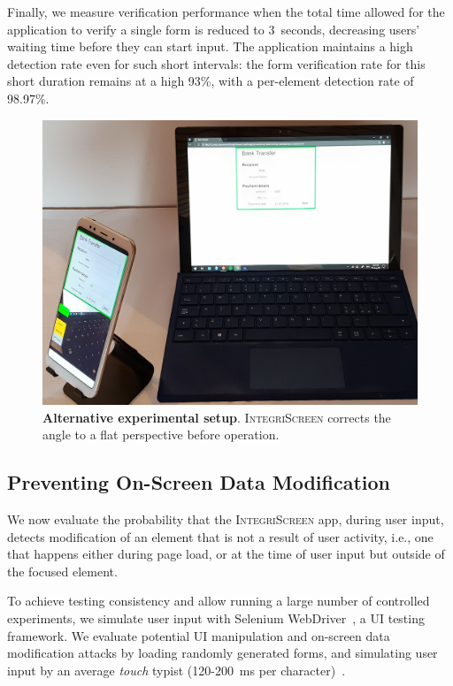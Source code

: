 \documentclass[sigconf, anonymous, balance=false]{acmart}
\newcommand{\myparagraph}[1]{\myparagraphnodot{#1.}}
\newcommand{\myparagraphnodot}[1]{\vspace{4pt} \noindent {\bfseries #1}\xspace}
\newcommand{\sysname}{\textsc{IntegriScreen}\xspace}
\newcommand{\name}{\sysname}
\begin{document}
Finally, we measure verification performance when the total time allowed for the application to verify a single form is reduced to 3~seconds, decreasing users' waiting time before they can start input.
The application maintains a high detection rate even for such short intervals: the form verification rate for this short duration remains at a high 93\%, with a per-element detection rate of 98.97\%.

\begin{figure}[t]
	\centering
	\includegraphics[width=0.7\columnwidth]{img/ExperimentalSetupRightAngle2.jpg}
	\caption{
		\textbf{Alternative experimental setup}.
		\name corrects the angle to a flat perspective before operation.
	} \label{fig:experimentalSetupRightAngle}
\end{figure}




\subsection{Preventing On-Screen Data Modification} \label{ssec:inputSupervisionEvaluation}

We now evaluate the probability that the \sysname app, during user input, detects modification of an element that is not a result of user activity, i.e., one that happens either during page load, or at the time of user input but outside of the focused element.

\myparagraph{Setup}
To achieve testing consistency and allow running a large number of controlled experiments, we simulate user input with Selenium WebDriver~\cite{seleniumWebDriver}, a UI testing framework.
We evaluate potential UI manipulation and on-screen data modification attacks by loading randomly generated forms, and simulating user input by an average \textit{touch} typist (120-200~ms per character)~\cite{pereira2013effect}.
\end{document}
